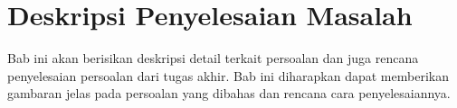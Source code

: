 \chapter{Deskripsi Penyelesaian Masalah}


Bab ini akan berisikan deskripsi detail terkait persoalan dan juga rencana penyelesaian persoalan dari tugas akhir. Bab ini diharapkan dapat memberikan gambaran jelas pada persoalan yang dibahas dan rencana cara penyelesaiannya.










